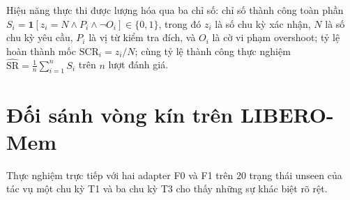 Hiệu năng thực thi được lượng hóa qua ba chỉ số: chỉ số thành công toàn phần $S_i = \mathbf{1}[z_i = N \land P_i \land \neg O_i] \in \{0, 1\}$, trong đó $z_i$ là số chu kỳ xác nhận, $N$ là số chu kỳ yêu cầu, $P_i$ là vị từ kiểm tra đích, và $O_i$ là cờ vi phạm overshoot; tỷ lệ hoàn thành mốc $\mathrm{SCR}_i = z_i / N$; cùng tỷ lệ thành công thực nghiệm $\widehat{\mathrm{SR}} = \frac{1}{n}\sum_{i=1}^{n} S_i$ trên $n$ lượt đánh giá.

\section{Đối sánh vòng kín trên LIBERO-Mem}

Thực nghiệm trực tiếp với hai adapter F0 và F1 trên 20 trạng thái unseen của tác vụ một chu kỳ T1 và ba chu kỳ T3 cho thấy những sự khác biệt rõ rệt.
